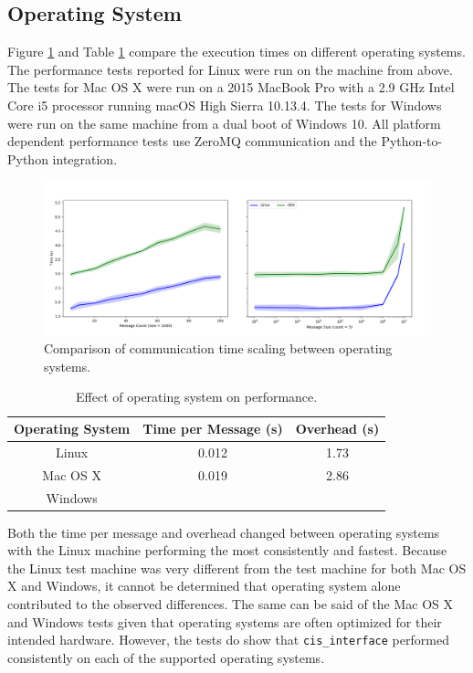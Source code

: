 \documentclass[journal]{IEEEtran}
\newcommand{\todo}[1]{{\color{red}{#1}}}
\newcommand{\cis}{{\tt cis\_interface}{}}
\begin{document}
\subsection{Operating System}\label{SS:results_platform}
%
Figure \ref{fig:platform} and Table \ref{tab:platform} compare the execution times on different operating systems. The performance tests reported for Linux were run on the machine from above. The tests for Mac OS X were run on a 2015 MacBook Pro with a 2.9 GHz Intel Core i5 processor running macOS High Sierra 10.13.4. The tests for Windows were run on the same machine from a dual boot of Windows 10. All platform dependent performance tests use ZeroMQ communication and the Python-to-Python integration.
%
\ifinclfig
 	\begin{figure}[htbp]
	\begin{center}
	\includegraphics[width=\columnwidth,keepaspectratio]{./images/scaling_platform.png}
	\caption{Comparison of communication time scaling between operating systems.}
	\label{fig:platform}
	\end{center}
	\end{figure}
\fi
%
\begin{table}[htbp]
\begin{center}
\begin{tabular}{|c|c|c|}
\hline
Operating System	& Time per Message (s) 	& Overhead (s) 	\\\hline
Linux			& 0.012				& 1.73			\\
Mac OS X			& 0.019				& 2.86			\\
Windows			& \todo{?}				& \todo{?}			\\\hline
\end{tabular}
\end{center}
\caption{Effect of operating system on performance.}
\label{tab:platform}
\end{table}%
%
Both the time per message and overhead changed between operating systems with the Linux machine performing the most consistently and fastest. Because the Linux test machine was very different from the test machine for both Mac OS X and Windows, it cannot be determined that operating system alone contributed to the observed differences. The same can be said of the Mac OS X and Windows tests given that operating systems are often optimized for their intended hardware. However, the tests do show that {\cis} performed consistently on each of the supported operating systems.
\todo{Windows results \& discussion}
\end{document}
